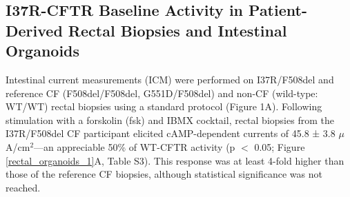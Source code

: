 \subsection{I37R-CFTR Baseline Activity in Patient-Derived Rectal Biopsies and Intestinal Organoids}
Intestinal current measurements (ICM) were performed on I37R/F508del and reference CF (F508del/F508del, G551D/F508del) and non-CF (wild-type: WT/WT) rectal biopsies using a standard protocol \cite{clancy2013, graeber2015} (Figure 1A). Following stimulation with a forskolin (fsk) and IBMX cocktail, rectal biopsies from the I37R/F508del CF participant elicited cAMP-dependent currents of 45.8 ± 3.8 $\mu$A/cm$^2$—an appreciable 50\% of WT-CFTR activity (p $<$ 0.05; Figure \ref{rectal_organoids_1}A, Table S3). This response was at least 4-fold higher than those of the reference CF biopsies, although statistical significance was not reached.


